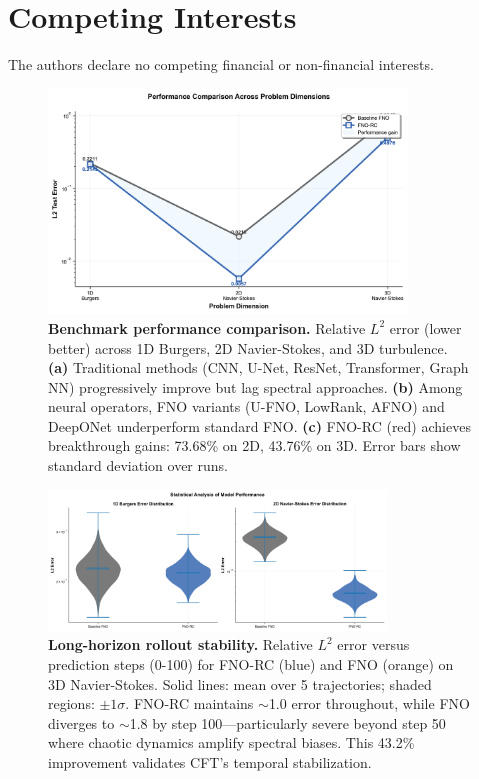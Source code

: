 \documentclass[11pt]{article}
\begin{document}
\section*{Competing Interests}
The authors declare no competing financial or non-financial interests.




\clearpage

\begin{figure}[t]
\centering
\includegraphics[width=0.85\textwidth]{figures/performance_comparison.png}
\caption{\textbf{Benchmark performance comparison.} Relative $L^2$ error (lower better) across 1D Burgers, 2D Navier-Stokes, and 3D turbulence. \textbf{(a)} Traditional methods (CNN, U-Net, ResNet, Transformer, Graph NN) progressively improve but lag spectral approaches. \textbf{(b)} Among neural operators, FNO variants (U-FNO, LowRank, AFNO) and DeepONet underperform standard FNO. \textbf{(c)} FNO-RC (red) achieves breakthrough gains: 73.68\% on 2D, 43.76\% on 3D. Error bars show standard deviation over runs.}
\label{fig:performance}
\end{figure}

\begin{figure}[t]
\centering
\includegraphics[width=0.8\textwidth]{figures/long_term_prediction.png}
\caption{\textbf{Long-horizon rollout stability.} Relative $L^2$ error versus prediction steps (0-100) for FNO-RC (blue) and FNO (orange) on 3D Navier-Stokes. Solid lines: mean over 5 trajectories; shaded regions: $\pm 1\sigma$. FNO-RC maintains $\sim$1.0 error throughout, while FNO diverges to $\sim$1.8 by step 100—particularly severe beyond step 50 where chaotic dynamics amplify spectral biases. This 43.2\% improvement validates CFT's temporal stabilization.}
\label{fig:rollout}
\end{figure}
\end{document}
